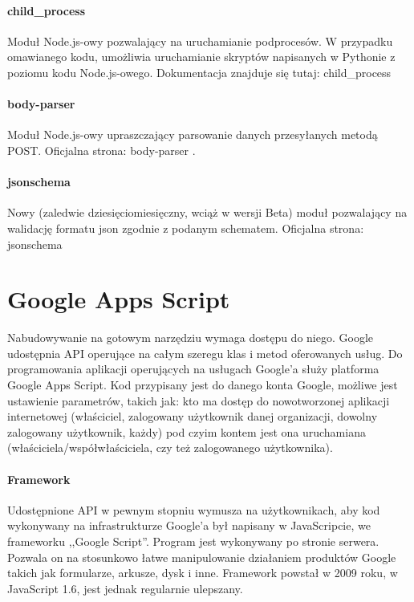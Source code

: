 \paragraph{child\_process}
Moduł Node.js-owy pozwalający na uruchamianie podprocesów. W przypadku omawianego kodu, umożliwia uruchamianie skryptów napisanych  w Pythonie z poziomu kodu Node.js-owego.
\ind Dokumentacja znajduje się tutaj: child\_process \cite{childprocess}
\paragraph{body-parser}
Moduł Node.js-owy upraszczający parsowanie danych przesyłanych metodą POST. 
\ind Oficjalna strona: body-parser \cite{body-parser}.
\paragraph{jsonschema}
\ind Nowy (zaledwie dziesięciomiesięczny, wciąż w wersji Beta) moduł pozwalający na walidację formatu json zgodnie z podanym schematem.
\ind Oficjalna strona: jsonschema \cite{jsonschema}

\section{Google Apps Script}
Nabudowywanie na gotowym narzędziu wymaga dostępu do niego. Google udostępnia API operujące na całym szeregu klas i metod oferowanych usług. Do programowania aplikacji operujących na usługach Google'a służy platforma Google Apps Script. Kod przypisany jest do danego konta Google, możliwe jest ustawienie parametrów, takich  jak: kto ma dostęp do nowotworzonej aplikacji internetowej (właściciel, zalogowany użytkownik danej organizacji, dowolny zalogowany użytkownik, każdy) pod czyim kontem jest ona uruchamiana (właściciela/współwłaściciela, czy też zalogowanego użytkownika). 

\paragraph{Framework}
Udostępnione API w pewnym stopniu wymusza na użytkownikach, aby kod wykonywany na infrastrukturze Google'a był napisany w JavaScripcie, we frameworku ,,Google Script''. Program jest wykonywany po stronie serwera. Pozwala on na stosunkowo łatwe manipulowanie działaniem produktów Google takich jak formularze, arkusze, dysk i inne. 
\ind Framework powstał w 2009 roku, w JavaScript 1.6, jest jednak regularnie ulepszany.

